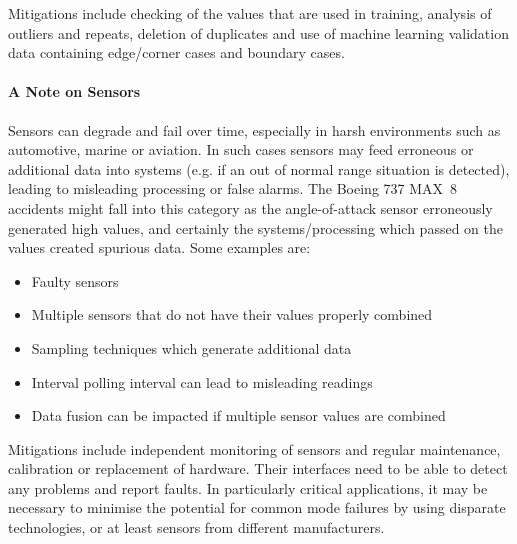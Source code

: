 Mitigations include checking of the values that are used in training, analysis of outliers and repeats, deletion of duplicates and use of machine learning validation data containing edge/corner cases and boundary cases.

\paragraph{A Note on Sensors}
Sensors can degrade and fail over time, especially in harsh environments such as automotive, marine or aviation. In such cases sensors may feed erroneous or additional data into systems (e.g. if an out of normal range situation is detected), leading to misleading processing or false alarms. The Boeing 737 MAX~8 accidents might fall into this category as the angle-of-attack sensor erroneously generated high values, and certainly the systems/processing which passed on the values created spurious data. Some examples are:
\begin{itemize}
    \item Faulty sensors
    \item Multiple sensors that do not have their values properly combined
    \item Sampling techniques which generate additional data
    \item Interval polling interval can lead to misleading readings
    \item Data fusion can be impacted if multiple sensor values are combined
\end{itemize}

Mitigations include independent monitoring of sensors and regular maintenance, calibration or replacement of hardware. Their interfaces need to be able to detect any problems and report faults. In particularly critical applications, it may be necessary to minimise the potential for common mode failures by using disparate technologies, or at least sensors from different manufacturers.

